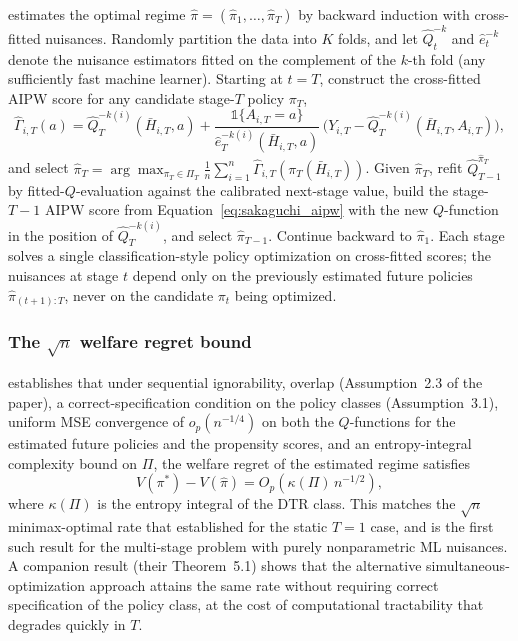 \citet{sakaguchi2024dynamicpolicy} estimates the optimal regime $\hat\pi = (\hat\pi_1, \ldots, \hat\pi_T)$ by backward induction with cross-fitted nuisances. Randomly partition the data into $K$ folds, and let $\hat Q^{-k}_t$ and $\hat e^{-k}_t$ denote the nuisance estimators fitted on the complement of the $k$-th fold (any sufficiently fast machine learner). Starting at $t = T$, construct the cross-fitted AIPW score for any candidate stage-$T$ policy $\pi_T$,
\begin{equation}
\hat\Gamma_{i, T}(a) = \hat Q^{-k(i)}_T(\bar H_{i,T}, a) + \frac{\mathbb 1\{A_{i,T} = a\}}{\hat e^{-k(i)}_T(\bar H_{i,T}, a)}\,\bigl(Y_{i,T} - \hat Q^{-k(i)}_T(\bar H_{i,T}, A_{i,T})\bigr),
\label{eq:sakaguchi_aipw}
\end{equation}
and select $\hat\pi_T = \arg\max_{\pi_T \in \Pi_T} \tfrac{1}{n}\sum_{i=1}^n \hat\Gamma_{i,T}(\pi_T(\bar H_{i,T}))$. Given $\hat\pi_T$, refit $\hat Q^{\hat\pi_T}_{T-1}$ by fitted-$Q$-evaluation against the calibrated next-stage value, build the stage-$T{-}1$ AIPW score from Equation~\eqref{eq:sakaguchi_aipw} with the new $Q$-function in the position of $\hat Q^{-k(i)}_T$, and select $\hat\pi_{T-1}$. Continue backward to $\hat\pi_1$. Each stage solves a single classification-style policy optimization on cross-fitted scores; the nuisances at stage $t$ depend only on the previously estimated future policies $\hat\pi_{(t+1):T}$, never on the candidate $\pi_t$ being optimized.

\subsubsection*{The $\sqrt n$ welfare regret bound}

\citet[Theorem~4.3]{sakaguchi2024dynamicpolicy} establishes that under sequential ignorability, overlap (Assumption~2.3 of the paper), a correct-specification condition on the policy classes (Assumption~3.1), uniform MSE convergence of $o_p(n^{-1/4})$ on both the $Q$-functions for the estimated future policies and the propensity scores, and an entropy-integral complexity bound on $\Pi$, the welfare regret of the estimated regime satisfies
\begin{equation}
V(\pi^*) - V(\hat\pi) = O_p\!\left(\kappa(\Pi)\, n^{-1/2}\right),
\label{eq:sakaguchi_regret}
\end{equation}
where $\kappa(\Pi)$ is the entropy integral of the DTR class. This matches the $\sqrt n$ minimax-optimal rate that \citet{kitagawa2018who} established for the static $T=1$ case, and is the first such result for the multi-stage problem with purely nonparametric ML nuisances. A companion result (their Theorem~5.1) shows that the alternative simultaneous-optimization approach attains the same rate without requiring correct specification of the policy class, at the cost of computational tractability that degrades quickly in $T$.

